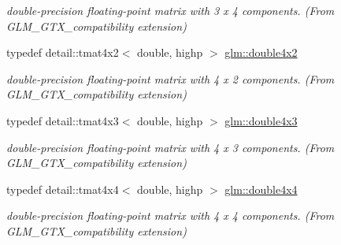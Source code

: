 \begin{DoxyCompactItemize}
\begin{DoxyCompactList}\small\item\em double-\/precision floating-\/point matrix with 3 x 4 components. (From G\+L\+M\+\_\+\+G\+T\+X\+\_\+compatibility extension) \end{DoxyCompactList}\item 
typedef detail\+::tmat4x2$<$ double, highp $>$ \hyperlink{group__gtx__compatibility_ga816d1a516a5ec13511fe1ae703ddcf94}{glm\+::double4x2}\hypertarget{group__gtx__compatibility_ga816d1a516a5ec13511fe1ae703ddcf94}{}\label{group__gtx__compatibility_ga816d1a516a5ec13511fe1ae703ddcf94}

\begin{DoxyCompactList}\small\item\em double-\/precision floating-\/point matrix with 4 x 2 components. (From G\+L\+M\+\_\+\+G\+T\+X\+\_\+compatibility extension) \end{DoxyCompactList}\item 
typedef detail\+::tmat4x3$<$ double, highp $>$ \hyperlink{group__gtx__compatibility_ga1199ee41226db53d5f190d0628041845}{glm\+::double4x3}\hypertarget{group__gtx__compatibility_ga1199ee41226db53d5f190d0628041845}{}\label{group__gtx__compatibility_ga1199ee41226db53d5f190d0628041845}

\begin{DoxyCompactList}\small\item\em double-\/precision floating-\/point matrix with 4 x 3 components. (From G\+L\+M\+\_\+\+G\+T\+X\+\_\+compatibility extension) \end{DoxyCompactList}\item 
typedef detail\+::tmat4x4$<$ double, highp $>$ \hyperlink{group__gtx__compatibility_ga95e88bfe8dea34a6d4b30b1029c3e2da}{glm\+::double4x4}\hypertarget{group__gtx__compatibility_ga95e88bfe8dea34a6d4b30b1029c3e2da}{}\label{group__gtx__compatibility_ga95e88bfe8dea34a6d4b30b1029c3e2da}

\begin{DoxyCompactList}\small\item\em double-\/precision floating-\/point matrix with 4 x 4 components. (From G\+L\+M\+\_\+\+G\+T\+X\+\_\+compatibility extension) \end{DoxyCompactList}\end{DoxyCompactItemize}
